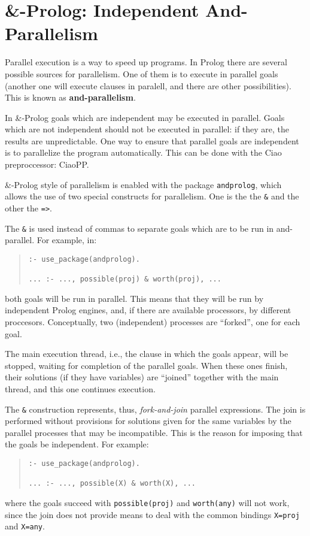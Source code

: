 
\section{\&-Prolog: Independent And-Parallelism}

Parallel execution is a way to speed up programs. In Prolog there are
several possible sources for parallelism. One of them is to execute in
parallel goals (another one will execute clauses in paralell, and
there are other possibilities). This is known as {\bf and-parallelism}.

In \&-Prolog goals which are independent may be executed in parallel.
Goals which are not independent should not be executed in parallel: if
they are, the results are unpredictable. One way to ensure that
parallel goals are independent is to parallelize the program
automatically. This can be done with the Ciao preproccessor: CiaoPP.

\&-Prolog style of parallelism is enabled with the package
\verb+andprolog+, which allows the use of two special constructs for
parallelism. One is the the \verb+&+ and the other the \verb+=>+.

The \verb+&+ is used instead of commas to separate goals which are to
be run in and-parallel. For example, in:
\begin{quote}
\begin{verbatim}
:- use_package(andprolog).

... :- ..., possible(proj) & worth(proj), ...
\end{verbatim}
\end{quote}
%
both goals will be run in parallel. This means that they will be run
by independent Prolog engines, and, if there are available processors,
by different proccesors. Conceptually, two (independent) processes are
``forked'', one for each goal.

The main execution thread, i.e., the clause in which the goals appear,
will be stopped, waiting for completion of the parallel goals. When
these ones finish, their solutions (if they have variables) are
``joined'' together with the main thread, and this one continues
execution. 

The \verb+&+ construction represents, thus, {\em fork-and-join}
parallel expressions. The join is performed without provisions for
solutions given for the same variables by the parallel processes that
may be incompatible. This is the reason for imposing that the goals be
independent. For example:
\begin{quote}
\begin{verbatim}
:- use_package(andprolog).

... :- ..., possible(X) & worth(X), ...
\end{verbatim}
\end{quote}
%
where the goals succeed with \verb+possible(proj)+ and
\verb+worth(any)+ will not work, since the join does not provide means
to deal with the common bindings \verb+X=proj+ and \verb+X=any+.

